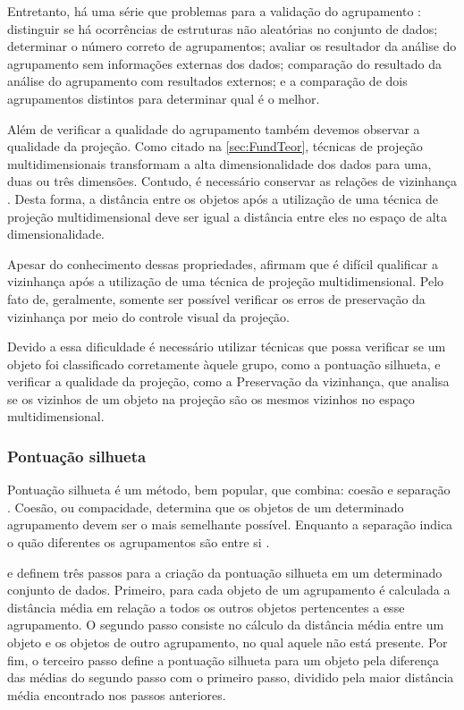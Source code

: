 			Entretanto, há uma série que problemas para a validação do agrupamento
			\cite{Tan:2005:ch8}: distinguir se há ocorrências de estruturas não aleatórias
			no conjunto de dados; determinar o número correto de agrupamentos; avaliar
			os resultador da análise do agrupamento sem informações externas dos dados;
			comparação do resultado da análise do agrupamento com resultados externos;
			e a comparação de dois agrupamentos distintos para determinar qual é o melhor.
			
			Além de verificar a qualidade do agrupamento também devemos observar a
			qualidade da projeção. Como citado na \cref{sec:FundTeor}, técnicas de projeção
			multidimensionais transformam a alta dimensionalidade dos dados para uma, duas
			ou três dimensões. Contudo, é necessário conservar as relações de vizinhança
			\cite{bauer1992quantifying}. Desta forma, a distância entre os objetos após a
			utilização de uma técnica de projeção multidimensional deve ser igual a distância
			entre eles no espaço de alta dimensionalidade.
			
			Apesar do conhecimento dessas propriedades, 
			afirmam que é difícil qualificar a vizinhança após a utilização de uma técnica
			de projeção multidimensional. Pelo fato de, geralmente, somente ser possível
			verificar os erros de preservação da vizinhança por meio do controle visual
			da projeção.
			
			Devido a essa dificuldade é necessário utilizar técnicas que possa verificar
			se um objeto foi classificado corretamente àquele grupo, como a pontuação
			silhueta, e verificar a qualidade da projeção, como a Preservação da vizinhança,
			que analisa se os vizinhos de um objeto na projeção são os mesmos vizinhos
			no espaço multidimensional.
			
			\subsubsection{Pontuação silhueta}

				Pontuação silhueta é um método, bem popular, que combina: coesão e separação
				\cite{Tan:2005:ch8}. Coesão, ou compacidade, determina que os objetos
				de um determinado agrupamento devem ser o mais semelhante possível. Enquanto
				a separação indica o quão diferentes os agrupamentos são entre si
				\cite{Tan:2005:ch8, Berry:1997:DMT:560675}.
				
				 e  definem
				três passos para a criação da pontuação silhueta em um determinado conjunto
				de dados. Primeiro, para cada objeto de um agrupamento é calculada a distância
				média em relação a todos os outros objetos pertencentes a esse agrupamento.
				O segundo passo consiste no cálculo da distância média entre um objeto e 
				os objetos de outro agrupamento, no qual aquele não está presente. Por fim, o
				terceiro passo define a pontuação silhueta para um objeto pela diferença das
				médias do segundo passo com o primeiro passo, dividido pela maior distância média
				encontrado nos passos anteriores.
				

